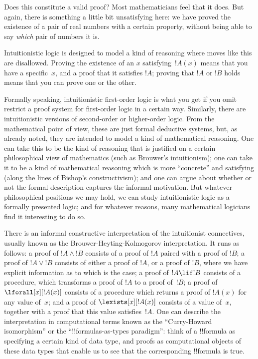 \documentclass[../../include/open-logic-section]{subfiles}
\begin{document}
Does this constitute a valid proof? Most mathematicians feel that it
does. But again, there is something a little bit unsatisfying here: we
have proved the existence of a pair of real numbers with a certain
property, without being able to say \emph{which} pair of numbers it is.

Intuitionistic logic is designed to model a kind of reasoning where
moves like this are disallowed. Proving the existence of an $x$
satisfying~$!A(x)$ means that you have a specific~$x$, and a proof
that it satisfies $!A$; proving that $!A$ or $!B$ holds means that
you can prove one or the other.

Formally speaking, intuitionistic first-order logic is what you get if
you omit restrict a proof system for first-order logic in a certain
way. Similarly, there are intuitionistic versions of second-order or
higher-order logic. From the mathematical point of view, these are
just formal deductive systems, but, as already noted, they are
intended to model a kind of mathematical reasoning. One can take this
to be the kind of reasoning that is justified on a certain
philosophical view of mathematics (such as Brouwer's intuitionism);
one can take it to be a kind of mathematical reasoning which is more
``concrete'' and satisfying (along the lines of Bishop's
constructivism); and one can argue about whether or not the formal
description captures the informal motivation. But whatever
philosophical positions we may hold, we can study intuitionistic logic
as a formally presented logic; and for whatever reasons, many
mathematical logicians find it interesting to do so.

There is an informal constructive interpretation of the intuitionist
connectives, usually known as the Brouwer-Heyting-Kolmogorov
interpretation. It runs as follows: a proof of $!A \land !B$ consists
of a proof of $!A$ paired with a proof of $!B$; a proof of $!A \lor
!B$ consists of either a proof of $!A$, or a proof of $!B$, where we
have explicit information as to which is the case; a proof of $!A \lif
!B$ consists of a procedure, which transforms a proof of $!A$ to a
proof of~$!B$; a proof of $\lforall[x][!A(x)]$ consists of a procedure
which returns a proof of $!A(x)$ for any value of~$x$; and a proof of
$\lexists[x][!A(x)]$ consists of a value of~$x$, together with a proof
that this value satisfies~$!A$. One can describe the interpretation in
computational terms known as the ``Curry-Howard isomorphism'' or the
``!!{formula}s-as-types paradigm'': think of a !!{formula} as
specifying a certain kind of data type, and proofs as computational
objects of these data types that enable us to see that the
corresponding !!{formula} is true.
\end{document}

